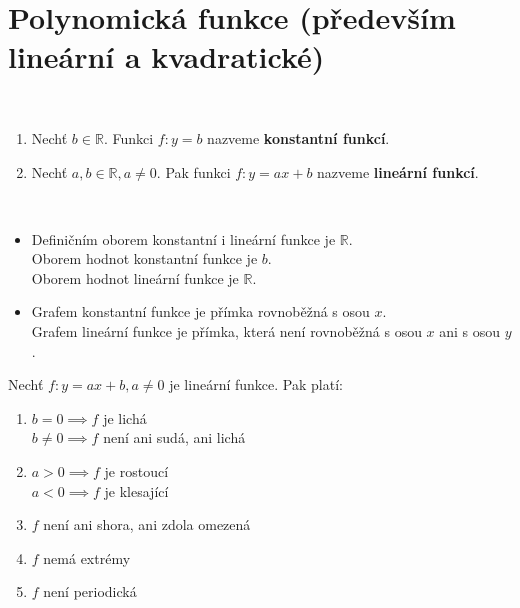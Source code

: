 \section{Polynomická funkce (především lineární a kvadratické)}

\begin{definition}\,
\begin{enumerate}
  \item Nechť $b \in \mathbb R$. Funkci $f:y = b$ nazveme \textbf{konstantní funkcí}.
  \item Nechť $a, b \in \mathbb R, a \neq 0$. Pak funkci $f:y= ax + b$ nazveme \textbf{lineární funkcí}.
\end{enumerate}
\end{definition}

\begin{pozn}\,
  \begin{itemize}
    \item Definičním oborem konstantní i lineární funkce je $\mathbb R$. \\
          Oborem hodnot konstantní funkce je ${b}$.\\
          Oborem hodnot lineární funkce je $\mathbb R$.
    \item Grafem konstantní funkce je přímka rovnoběžná s osou $x$. \\
          Grafem lineární funkce je přímka, která není rovnoběžná s osou $x$ ani s osou $y$.
  \end{itemize}
\end{pozn}

\begin{veta}
  Nechť $f: y = ax + b, a \neq 0$ je lineární funkce. Pak platí:
  \begin{enumerate}[1.]
    \item $b=0 \implies f$ je lichá\\
          $b \neq 0 \implies f$ není ani sudá, ani lichá
    \item $a > 0 \implies f$ je rostoucí\\
          $a < 0 \implies f$ je klesající
    \item $f$ není ani shora, ani zdola omezená
    \item $f$ nemá extrémy
    \item $f$ není periodická
  \end{enumerate}
\end{veta}

